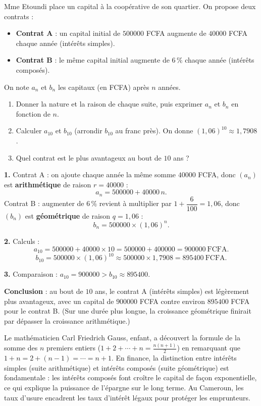 \documentclass[11pt]{article}
\begin{document}
\begin{exoresolu}
Mme Etoundi place un capital à la coopérative de son quartier. On propose deux contrats :
\begin{itemize}
\item \textbf{Contrat A} : un capital initial de $\num{500000}$ FCFA augmente de $\num{40000}$ FCFA chaque année (intérêts simples).
\item \textbf{Contrat B} : le même capital initial augmente de $6\,\%$ chaque année (intérêts composés).
\end{itemize}
On note $a_n$ et $b_n$ les capitaux (en FCFA) après $n$ années.
\begin{enumerate}
\item Donner la nature et la raison de chaque suite, puis exprimer $a_n$ et $b_n$ en fonction de $n$.
\item Calculer $a_{10}$ et $b_{10}$ (arrondir $b_{10}$ au franc près). On donne $(1,06)^{10}\approx 1,7908$.
\item Quel contrat est le plus avantageux au bout de $10$ ans ?
\end{enumerate}
\tcblower
\textbf{1.} Contrat A : on ajoute chaque année la même somme $\num{40000}$ FCFA, donc $(a_n)$ est \textbf{arithmétique} de raison $r=\num{40000}$ :
\[a_n=\num{500000}+\num{40000}\,n.\]
Contrat B : augmenter de $6\,\%$ revient à multiplier par $1+\dfrac{6}{100}=1,06$, donc $(b_n)$ est \textbf{géométrique} de raison $q=1,06$ :
\[b_n=\num{500000}\times(1,06)^n.\]

\textbf{2.} Calculs :
\[a_{10}=\num{500000}+\num{40000}\times 10=\num{500000}+\num{400000}=\num{900000}\ \text{FCFA}.\]
\[b_{10}=\num{500000}\times(1,06)^{10}\approx \num{500000}\times 1,7908=\num{895400}\ \text{FCFA}.\]

\textbf{3.} Comparaison : $a_{10}=\num{900000}>b_{10}\approx\num{895400}$.

\textbf{Conclusion} : au bout de $10$ ans, le contrat A (intérêts simples) est légèrement plus avantageux, avec un capital de $\num{900000}$ FCFA contre environ $\num{895400}$ FCFA pour le contrat B. (Sur une durée plus longue, la croissance géométrique finirait par dépasser la croissance arithmétique.)
\end{exoresolu}

\begin{savaistu}
Le mathématicien Carl Friedrich Gauss, enfant, a découvert la formule de la somme des $n$ premiers entiers ($1+2+\cdots+n = \frac{n(n+1)}{2}$) en remarquant que $1+n = 2+(n-1) = \cdots = n+1$. En finance, la distinction entre intérêts simples (suite arithmétique) et intérêts composés (suite géométrique) est fondamentale : les intérêts composés font croître le capital de façon exponentielle, ce qui explique la puissance de l'épargne sur le long terme. Au Cameroun, les taux d'usure encadrent les taux d'intérêt légaux pour protéger les emprunteurs.
\end{savaistu}
\end{document}
